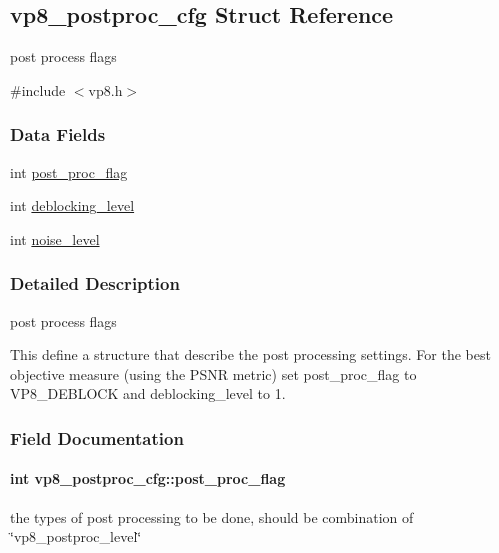 \hypertarget{structvp8__postproc__cfg}{}\subsection{vp8\+\_\+postproc\+\_\+cfg Struct Reference}
\label{structvp8__postproc__cfg}


post process flags  




{\ttfamily \#include $<$vp8.\+h$>$}

\subsubsection*{Data Fields}
\begin{DoxyCompactItemize}
\item 
int \hyperlink{structvp8__postproc__cfg_ae9adc230642ac230f39eb4c531cf85e5}{post\+\_\+proc\+\_\+flag}
\item 
int \hyperlink{structvp8__postproc__cfg_afe919a9546e79798d840b1492f7e0249}{deblocking\+\_\+level}
\item 
int \hyperlink{structvp8__postproc__cfg_a32f28e4003e5d9bf55d188247f3f156c}{noise\+\_\+level}
\end{DoxyCompactItemize}


\subsubsection{Detailed Description}
post process flags 

This define a structure that describe the post processing settings. For the best objective measure (using the P\+S\+NR metric) set post\+\_\+proc\+\_\+flag to V\+P8\+\_\+\+D\+E\+B\+L\+O\+CK and deblocking\+\_\+level to 1. 

\subsubsection{Field Documentation}
\paragraph[{\texorpdfstring{post\+\_\+proc\+\_\+flag}{post_proc_flag}}]{\setlength{\rightskip}{0pt plus 5cm}int vp8\+\_\+postproc\+\_\+cfg\+::post\+\_\+proc\+\_\+flag}\hypertarget{structvp8__postproc__cfg_ae9adc230642ac230f39eb4c531cf85e5}{}\label{structvp8__postproc__cfg_ae9adc230642ac230f39eb4c531cf85e5}
the types of post processing to be done, should be combination of \char`\"{}vp8\+\_\+postproc\+\_\+level\char`\"{} 

